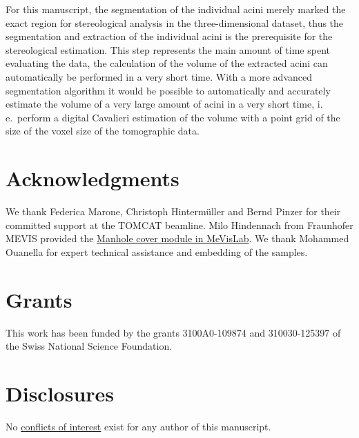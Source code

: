 \documentclass[a4paper,DIV=calc,abstract,english]{scrartcl}
\newif\ifJCS
\newcommand{\ie}{i.\,e.\ }
\begin{document}
For this manuscript, the segmentation of the individual acini merely marked the exact region for stereological analysis in the three-dimensional dataset, thus the segmentation and extraction of the individual acini is the prerequisite for the stereological estimation.
This step represents the main amount of time spent evaluating the data, the calculation of the volume of the extracted acini can automatically be performed in a very short time.
With a more advanced segmentation algorithm it would be possible to automatically and accurately estimate the volume of a very large amount of acini in a very short time, \ie perform a digital Cavalieri estimation of the volume with a point grid of the size of the voxel size of the tomographic data.

\clearpage
\section{Acknowledgments}
We thank Federica Marone, Christoph Hintermüller and Bernd Pinzer for their committed support at the TOMCAT beamline.
Milo Hindennach from Fraunhofer MEVIS provided the \href{http://www.mevis-research.de/cgi-bin/discus/board-auth.cgi?lm=1282233250&file=/839/11760.html}{Manhole cover module in MeVisLab}.
We thank Mohammed Ouanella for expert technical assistance and embedding of the samples.

\section{Grants}
This work has been funded by the grants 3100A0-109874 and 310030-125397 of the Swiss National Science Foundation.

\section{Disclosures}
No \href{http://www.the-aps.org/mm/Publications/Preparing-Your-Manuscript#conflicts}{conflicts of interest} exist for any author of this manuscript.

\clearpage
\ifJCS
	\singlespacing
\else
\fi


\end{document}
